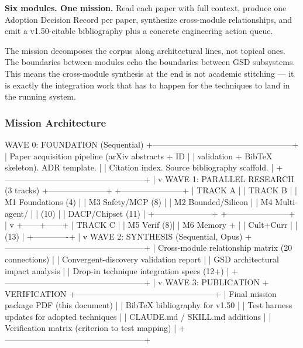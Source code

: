 \documentclass[11pt,letterpaper]{article}
\begin{document}
\begin{quotebox}
\textbf{Six modules. One mission.} Read each paper with full context, produce one Adoption Decision Record per paper, synthesize cross-module relationships, and emit a v1.50-citable bibliography plus a concrete engineering action queue.
\end{quotebox}

The mission decomposes the corpus along architectural lines, not topical ones. The boundaries between modules echo the boundaries between GSD subsystems. This means the cross-module synthesis at the end is not academic stitching --- it is exactly the integration work that has to happen for the techniques to land in the running system.

\subsubsection{Mission Architecture}

\begin{asciibox}
                  WAVE 0: FOUNDATION (Sequential)
        +---------------------------------------------------+
        | Paper acquisition pipeline (arXiv abstracts + ID  |
        | validation + BibTeX skeleton). ADR template.      |
        | Citation index. Source bibliography scaffold.     |
        +---------------------------------------------------+
                              |
                              v
                  WAVE 1: PARALLEL RESEARCH (3 tracks)
        +---------------------+ +-----------------------+
        | TRACK A             | | TRACK B               |
        | M1 Foundations (4)  | | M3 Safety/MCP (8)     |
        | M2 Bounded/Silicon  | | M4 Multi-agent/       |
        |    (10)             | |    DACP/Chipset (11)  |
        +---------------------+ +-----------------------+
                              |
                              v
                       +------+------+
                       | TRACK C     |
                       | M5 Verif (8)|
                       | M6 Memory + |
                       |   Cult+Curr |
                       |   (13)      |
                       +-------------+
                              |
                              v
                  WAVE 2: SYNTHESIS (Sequential, Opus)
        +---------------------------------------------------+
        | Cross-module relationship matrix (20 connections) |
        | Convergent-discovery validation report            |
        | GSD architectural impact analysis                 |
        | Drop-in technique integration specs (12+)         |
        +---------------------------------------------------+
                              |
                              v
                  WAVE 3: PUBLICATION + VERIFICATION
        +---------------------------------------------------+
        | Final mission package PDF (this document)         |
        | BibTeX bibliography for v1.50                     |
        | Test harness updates for adopted techniques       |
        | CLAUDE.md / SKILL.md additions                    |
        | Verification matrix (criterion to test mapping)   |
        +---------------------------------------------------+
\end{asciibox}
\end{document}
